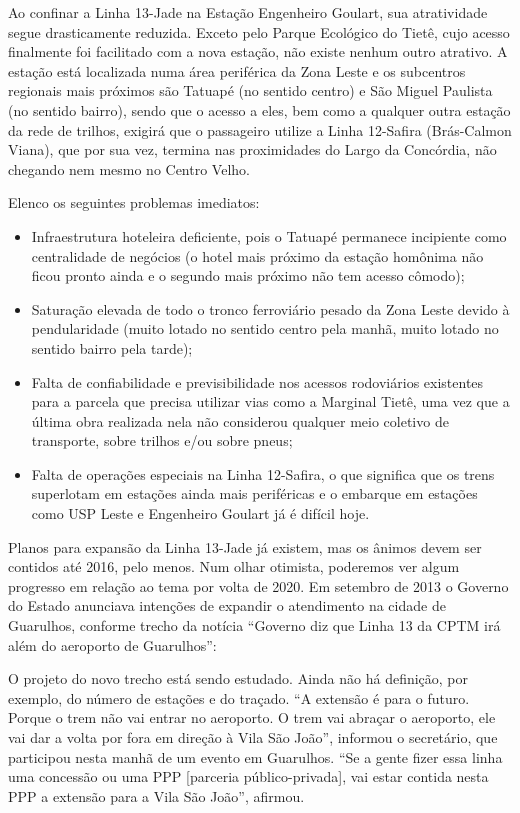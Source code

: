 \documentclass[11pt,fleqn]{book} %
\begin{document}
Ao confinar a Linha 13-Jade na Estação Engenheiro Goulart, sua atratividade segue drasticamente reduzida. Exceto pelo Parque Ecológico do Tietê, cujo acesso finalmente foi facilitado com a nova estação, não existe nenhum outro atrativo. A estação está localizada numa área periférica da Zona Leste e os subcentros regionais mais próximos são Tatuapé (no sentido centro) e São Miguel Paulista (no sentido bairro), sendo que o acesso a eles, bem como a qualquer outra estação da rede de trilhos, exigirá que o passageiro utilize a Linha 12-Safira (Brás-Calmon Viana), que por sua vez, termina nas proximidades do Largo da Concórdia, não chegando nem mesmo no Centro Velho.

Elenco os seguintes problemas imediatos:

\begin{itemize}
	\item Infraestrutura hoteleira deficiente, pois o Tatuapé permanece incipiente como centralidade de negócios (o hotel mais próximo da estação homônima não ficou pronto ainda e o segundo mais próximo não tem acesso cômodo);
	\item Saturação elevada de todo o tronco ferroviário pesado da Zona Leste devido à pendularidade (muito lotado no sentido centro pela manhã, muito lotado no sentido bairro pela tarde);
	\item Falta de confiabilidade e previsibilidade nos acessos rodoviários existentes para a parcela que precisa utilizar vias como a Marginal Tietê, uma vez que a última obra realizada nela não considerou qualquer meio coletivo de transporte, sobre trilhos e/ou sobre pneus;
	\item Falta de operações especiais na Linha 12-Safira, o que significa que os trens superlotam em estações ainda mais periféricas e o embarque em estações como USP Leste e Engenheiro Goulart já é difícil hoje.
\end{itemize}

Planos para expansão da Linha 13-Jade já existem, mas os ânimos devem ser contidos até 2016, pelo menos. Num olhar otimista, poderemos ver algum progresso em relação ao tema por volta de 2020. Em setembro de 2013 o Governo do Estado anunciava intenções de expandir o atendimento na cidade de Guarulhos, conforme trecho da notícia “Governo diz que Linha 13 da CPTM irá além do aeroporto de Guarulhos”:

\begin{citacao}
	O projeto do novo trecho está sendo estudado. Ainda não há definição, por exemplo, do número de estações e do traçado. “A extensão é para o futuro. Porque o trem não vai entrar no aeroporto. O trem vai abraçar o aeroporto, ele vai dar a volta por fora em direção à Vila São João”, informou o secretário, que participou nesta manhã de um evento em Guarulhos. “Se a gente fizer essa linha uma concessão ou uma PPP [parceria público-privada], vai estar contida nesta PPP a extensão para a Vila São João”, afirmou.
\end{citacao}
\end{document}
